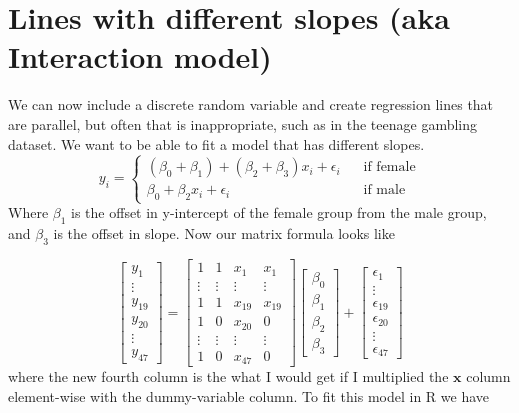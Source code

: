 \documentclass[]{book}
\theoremstyle{definition}
\theoremstyle{definition}
\theoremstyle{remark}
\begin{document}
\section{Lines with different slopes (aka Interaction
model)}\label{lines-with-different-slopes-aka-interaction-model}

We can now include a discrete random variable and create regression
lines that are parallel, but often that is inappropriate, such as in the
teenage gambling dataset. We want to be able to fit a model that has
different slopes. \[y_{i}=\begin{cases}
\left(\beta_{0}+\beta_{1}\right)+\left(\beta_{2}+\beta_{3}\right)x_{i}+\epsilon_{i} & \;\;\;\textrm{if female}\\
\beta_{0}+\beta_{2}x_{i}+\epsilon_{i} & \;\;\;\textrm{if male}
\end{cases}
\] Where \(\beta_{1}\) is the offset in y-intercept of the female group
from the male group, and \(\beta_{3}\) is the offset in slope. Now our
matrix formula looks like

\[\left[\begin{array}{c}
y_{1}\\
\vdots\\
y_{19}\\
y_{20}\\
\vdots\\
y_{47}
\end{array}\right]=\left[\begin{array}{cccc}
1 & 1 & x_{1} & x_{1}\\
\vdots & \vdots & \vdots & \vdots\\
1 & 1 & x_{19} & x_{19}\\
1 & 0 & x_{20} & 0\\
\vdots & \vdots & \vdots & \vdots\\
1 & 0 & x_{47} & 0
\end{array}\right]\left[\begin{array}{c}
\beta_{0}\\
\beta_{1}\\
\beta_{2}\\
\beta_{3}
\end{array}\right]+\left[\begin{array}{c}
\epsilon_{1}\\
\vdots\\
\epsilon_{19}\\
\epsilon_{20}\\
\vdots\\
\epsilon_{47}
\end{array}\right]
\] where the new fourth column is the what I would get if I multiplied
the \(\boldsymbol{x}\) column element-wise with the dummy-variable
column. To fit this model in R we have
\end{document}
